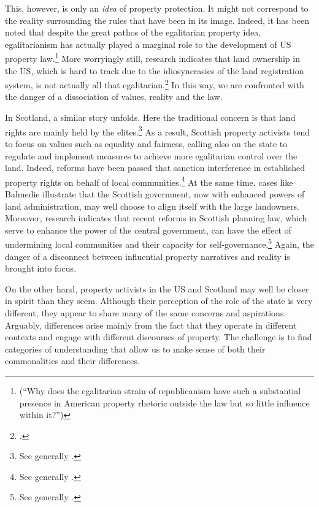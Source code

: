 This, however, is only an {\it idea} of property protection. It might not correspond to the reality surrounding the rules that have been  in its image. Indeed, it has been noted that despite the great pathos of the egalitarian property idea, egalitarianism has actually played a marginal role to the development of US property law.\footnote{\cite[361]{williams98} (``Why does the egalitarian strain of republicanism have such a substantial presence in American property rhetoric outside the law but so little influence within it?'')} More worryingly still, research indicates that land ownership in the US, which is hard to track due to the idiosyncrasies of the land registration system, is not actually all that egalitarian.\footcite[246-247]{jacobs98} In this way, we are confronted with the danger of a dissociation of values, reality and the law.

In Scotland, a similar story unfolds. Here the traditional concern is that land rights are mainly held by the elites.\footnote{See generally \cite{wightman96,wightman13}.} As a result, Scottish property activists tend to focus on values such as equality and fairness, calling also on the state to regulate and implement measures to achieve more egalitarian control over the land. Indeed, reforms have been passed that sanction interference in established property rights on behalf of local communities.\footnote{See generally \cite{lovett11,hoffman13}.} At the same time, cases like Balmedie illustrate that the Scottish government, now with enhanced powers of land administration, may well choose to align itself with the large landowners. Moreover, research indicates that recent reforms in Scottish planning law, which serve to enhance the power of the central government, can have the effect of undermining local communities and their capacity for self-governance.\footnote{See generally \cite{pacione13,pacione14}.} Again, the danger of a disconnect between influential property narratives and reality is brought into focus.

On the other hand,  property activists in the US and Scotland may well be closer in spirit than they seem. Although their perception of the role of the state is very different, they appear to share many of the same concerns and aspirations. Arguably, differences arise mainly from the fact that they operate in different contexts and engage with different discourses of property. The challenge is to find categories of understanding that allow us to make sense of both their commonalities and their differences.

